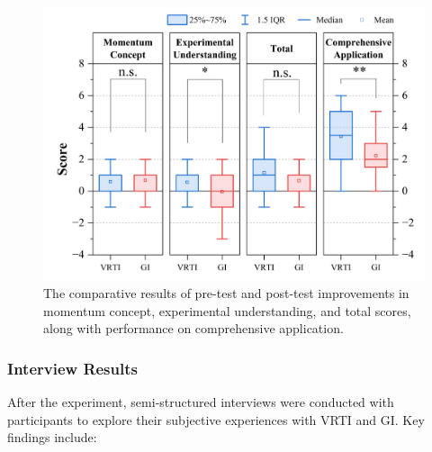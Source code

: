 \documentclass[runningheads]{llncs}
\begin{document}
\begin{figure}
  \centering
  \includegraphics[width=0.8\linewidth]{image/improvements-result.pdf}
  \caption{The comparative results of pre-test and post-test improvements in momentum concept, experimental understanding, and total scores, along with performance on comprehensive application.}
  \label{fig:improvements-result}
\end{figure}

\subsubsection{Interview Results}
After the experiment, semi-structured interviews were conducted with participants to explore their subjective experiences with VRTI and GI. Key findings include:
\end{document}
